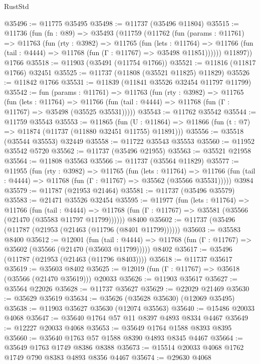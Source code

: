 \begin{lexlean}{RustStd}
\begin{coremodule}
@35496 := @11775 @35495
@35498 := @11737 (@35496 @11804)
@35515 := @11736
    (fun (fn : @89) =>
    @35493
      (@11759
        (@11762
          (fun (params : @11761) =>
          @11763
            (fun (rty : @3982) =>
            @11765
              (fun (lets : @11764) =>
              @11766 (fun (tail : @4444) => @11768 (fun (Γ : @11767) => @35498 @11851))))))
        @11897))
    @1766
@35518 := @11903 (@35491 (@11754 @1766))
@35521 := @11816 (@11817 @1766) @32451
@35525 := @11737 (@11808 (@35521 @11825) @11829)
@35526 := @11842 @1766
@35531 := @11839 (@11841 @35526 @32454 @11797 @11799)
@35542 := fun (params : @11761) =>
  @11763
    (fun (rty : @3982) =>
    @11765
      (fun (lets : @11764) =>
      @11766 (fun (tail : @4444) => @11768 (fun (Γ : @11767) => @35498 (@35525 @35531)))))
@35543 := @11762 @35542
@35544 := @11759 @35543
@35553 := @11865
    (fun (U : @11864) => @11866 (fun (t : @7) => @11874 (@11737 (@11880 @32451 @11755) @11891)))
@35556 := @35518 (@35544 @35553) @32449
@35558 := @11722 @35543 @35553
@35560 := @11952 @35542 @5720
@35562 := @11737 (@35496 @21955)
@35563 := @35521 @21958
@35564 := @11808 @35563
@35566 := @11737 (@35564 @11829)
@35577 := @11955
    (fun (rty : @3982) =>
    @11765
      (fun (lets : @11764) =>
      @11766 (fun (tail : @4444) => @11768 (fun (Γ : @11767) => @35562 (@35566 @35531)))))
    @3984
@35579 := @11787 (@21953 @21464)
@35581 := @11737 (@35496 @35579)
@35583 := @21471 @35526 @32454
@35595 := @11977
    (fun (lets : @11764) =>
    @11766
      (fun (tail : @4444) =>
      @11768 (fun (Γ : @11767) => @35581 (@35566 (@21470 (@35583 @11797 @11799))))))
    @8400
@35602 := @11737 (@35496 (@11787 (@21953 (@21463 (@11796 (@8401 @11799))))))
@35603 := @35583 @8400
@35612 := @12001
    (fun (tail : @4444) => @11768 (fun (Γ : @11767) => @35602 (@35566 (@21470 (@35603 @11799)))))
    @8402
@35617 := @35496 (@11787 (@21953 (@21463 (@11796 @8403))))
@35618 := @11737 @35617
@35619 := @35603 @8402
@35625 := @12019 (fun (Γ : @11767) => @35618 (@35566 (@21470 @35619))) @20033
@35626 := @11903 @35617
@35627 := @35564 @22026
@35628 := @11737 @35627
@35629 := @22029 @21469
@35630 := @35629 @35619
@35634 := @35626 (@35628 @35630) (@12069 @35495)
@35638 := @11903 @35627 @35630 (@12074 @35563)
@35640 := @15486 @20033 @4068
@35647 := @35640 @1764 @57 @11 @8397 @4893 @8334 @4467
@35649 := @12227 @20033 @4068
@35653 := @35649 @1764 @1588 @8393 @8395
@35660 := @35640 @1763 @57 @1588 @8390 @4893 @8345 @4467
@35664 := @35649 @1763 @1749 @8386 @8388
@35673 := @15514 @20033 @4068 @1762 @1749 @790 @8383 @4893 @8356 @4467
@35674 := @29630 @4068

\end{coremodule}
\end{lexlean}
